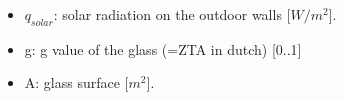 \begin{itemize}
    \item $q_{solar}$: solar radiation on the outdoor walls [$W/m^2$]. 
    \item g: g value of the glass (=ZTA in dutch) [0..1]\cite{zontoetreding}
    \item A: glass surface [$m^2$].
\end{itemize}


\newpage